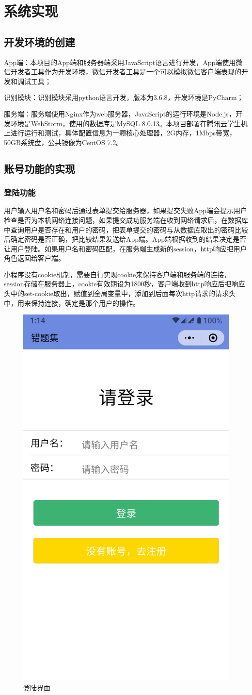\chapter{系统实现}

\section{开发环境的创建}
App端：本项目的App端和服务器端采用JavaScript语言进行开发，App端使用微信开发者工具作为开发环境，微信开发者工具是一个可以模拟微信客户端表现的开发和调试工具；
\par
识别模块：识别模块采用python语言开发，版本为3.6.8，开发环境是PyCharm；
\par
服务端：服务端使用Nginx作为web服务器，JavaScript的运行环境是Node.js，开发环境是WebStorm，使用的数据库是MySQL 8.0.13。本项目部署在腾讯云学生机上进行运行和测试，具体配置信息为一颗核心处理器，2G内存，1Mbps带宽，50GB系统盘，公共镜像为CentOS 7.2。

\section{账号功能的实现}
\subsection{登陆功能}
用户输入用户名和密码后通过表单提交给服务器，如果提交失败App端会提示用户检查是否为本机网络连接问题，如果提交成功服务端在收到网络请求后，在数据库中查询用户是否存在和用户的密码，把表单提交的密码与从数据库取出的密码比较后确定密码是否正确，把比较结果发送给App端。App端根据收到的结果决定是否让用户登陆。如果用户名和密码匹配，在服务端生成新的session，http响应把用户角色返回给客户端。
\par
小程序没有cookie机制，需要自行实现cookie来保持客户端和服务端的连接，session存储在服务器上，cookie有效期设为1800秒，客户端收到http响应后把响应头中的set-cookie取出，赋值到全局变量中，添加到后面每次http请求的请求头中，用来保持连接，确定是那个用户的操作。
\begin{figure}[h!]
	\centering
	\includegraphics[width=108bp, height = 192bp]{picture/login.png}
	\caption{登陆界面}
	\label{fig:}
\end{figure}
\newpage
